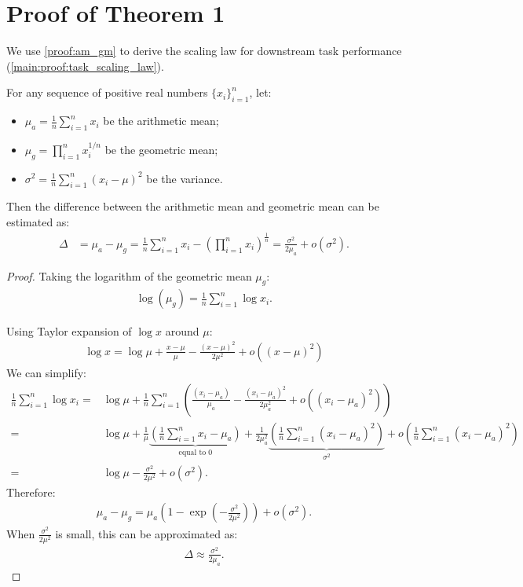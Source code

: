 \section{Proof of Theorem 1}
\label{sec:prop_proof}
We use \cref{proof:am_gm} to derive the scaling law for downstream task performance (\cref{main:proof:task_scaling_law}).
\begin{lemma}
\label{proof:am_gm}
For any sequence of positive real numbers $\{x_i\}_{i=1}^n$, let:
\begin{itemize}
    \item $\mu_a = \frac{1}{n}\sum_{i=1}^n x_i$ be the arithmetic mean;
    \item $\mu_g = \prod_{i=1}^n x_i^{1/n}$ be the geometric mean; 
    \item $\sigma^2 = \frac{1}{n}\sum_{i=1}^n (x_i-\mu)^2$ be the variance.
\end{itemize}
Then the difference between the arithmetic mean and geometric mean can be estimated as:
\begin{align}
    \Delta &= \mu_a-\mu_g = \frac{1}{n}\sum_{i=1}^n x_i-\left(\prod_{i=1}^n x_i\right)^{\frac{1}{n}} =\frac{\sigma^2}{2\mu_a}+o(\sigma^2).
\end{align}
\end{lemma}
\begin{proof}
Taking the logarithm of the geometric mean $\mu_g$:
\begin{align}
    \log (\mu_g)=\frac{1}{n} \sum_{i=1}^n \log x_i.
\end{align}

Using Taylor expansion of $\log x$ around $\mu$:
\begin{align}
    \log x = \log \mu + \frac{x-\mu}{\mu}-\frac{(x-\mu)^2}{2\mu^2}+o\left((x-\mu)^2\right)
\end{align}
We can simplify:
\begin{align*}
 \frac{1}{n} \sum_{i=1}^n \log x_i
=& \log \mu + \frac{1}{n}\sum_{i=1}^n\left(\frac{(x_i-\mu_a)}{\mu_a}-\frac{(x_i-\mu_a)^2}{2\mu_a^2}+o\left((x_i-\mu_a)^2\right)\right) \\
=& \log\mu +\frac{1}{\mu} \underbrace{\left(\frac{1}{n}\sum_{i=1}^nx_i -\mu_a\right)}_{\text{equal to 0}} + \frac{1}{2\mu_a^2}\underbrace{\left(\frac{1}{n}\sum_{i=1}^n(x_i-\mu_a)^2\right)}_{\sigma^2}+o\left(\frac{1}{n}\sum_{i=1}^n(x_i-\mu_a)^2\right)\\
=& \log \mu -\frac{\sigma^2}{2\mu^2} + o(\sigma^2).
\end{align*}
Therefore:
\begin{align}
    \mu_a-\mu_g = \mu_a \left(1-\exp{\left(-\frac{\sigma^2} {2\mu^2}\right)}\right) + o(\sigma^2).
\end{align}
When $\frac{\sigma^2}{2\mu^2}$ is small, this can be approximated as:
\begin{align}
    \Delta \approx \frac{\sigma^2}{2\mu_a}.
\end{align}
\end{proof}

